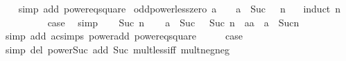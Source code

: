 \begin{isabellebody}
%
\isadelimproof
\ \ %
\endisadelimproof
%
\isatagproof
{}\isamarkupfalse%
\ {\isacharparenleft}{\kern0pt}simp\ add{\isacharcolon}{\kern0pt}\ power{}{\isacharunderscore}{\kern0pt}eq{\isacharunderscore}{\kern0pt}square{\isacharparenright}{\kern0pt}%
\endisatagproof
{\isafoldproof}%
%
\isadelimproof
\isanewline
%
\endisadelimproof
\isanewline
{}\isamarkupfalse%
\ odd{\isacharunderscore}{\kern0pt}power{\isacharunderscore}{\kern0pt}less{\isacharunderscore}{\kern0pt}zero{\isacharcolon}{\kern0pt}\ {\isachardoublequoteopen}a\ {\isacharless}{\kern0pt}\ {}\ {\isasymLongrightarrow}\ a\ {\isacharcircum}{\kern0pt}\ Suc\ {\isacharparenleft}{\kern0pt}{}\ {\isacharasterisk}{\kern0pt}\ n{\isacharparenright}{\kern0pt}\ {\isacharless}{\kern0pt}\ {}{\isachardoublequoteclose}\isanewline
%
\isadelimproof
%
\endisadelimproof
%
\isatagproof
{}\isamarkupfalse%
\ {\isacharparenleft}{\kern0pt}induct\ n{\isacharparenright}{\kern0pt}\isanewline
\ \ \isamarkupfalse%
\ {}\isanewline
\ \ \isamarkupfalse%
\ \isamarkupfalse%
\ {\isacharquery}{\kern0pt}case\ \isamarkupfalse%
\ simp\isanewline
{}\isamarkupfalse%
\isanewline
\ \ \isamarkupfalse%
\ {\isacharparenleft}{\kern0pt}Suc\ n{\isacharparenright}{\kern0pt}\isanewline
\ \ \isamarkupfalse%
\ {\isachardoublequoteopen}a\ {\isacharcircum}{\kern0pt}\ Suc\ {\isacharparenleft}{\kern0pt}{}\ {\isacharasterisk}{\kern0pt}\ Suc\ n{\isacharparenright}{\kern0pt}\ {\isacharequal}{\kern0pt}\ {\isacharparenleft}{\kern0pt}a{\isacharasterisk}{\kern0pt}a{\isacharparenright}{\kern0pt}\ {\isacharasterisk}{\kern0pt}\ a\ {\isacharcircum}{\kern0pt}\ Suc{\isacharparenleft}{\kern0pt}{}{\isacharasterisk}{\kern0pt}n{\isacharparenright}{\kern0pt}{\isachardoublequoteclose}\isanewline
\ \ \ \ \isamarkupfalse%
\ {\isacharparenleft}{\kern0pt}simp\ add{\isacharcolon}{\kern0pt}\ ac{\isacharunderscore}{\kern0pt}simps\ power{\isacharunderscore}{\kern0pt}add\ power{}{\isacharunderscore}{\kern0pt}eq{\isacharunderscore}{\kern0pt}square{\isacharparenright}{\kern0pt}\isanewline
\ \ \isamarkupfalse%
\ \isamarkupfalse%
\ {\isacharquery}{\kern0pt}case\isanewline
\ \ \ \ \isamarkupfalse%
\ {\isacharparenleft}{\kern0pt}simp\ del{\isacharcolon}{\kern0pt}\ power{\isacharunderscore}{\kern0pt}Suc\ add{\isacharcolon}{\kern0pt}\ Suc\ mult{\isacharunderscore}{\kern0pt}less{\isacharunderscore}{\kern0pt}{}{\isacharunderscore}{\kern0pt}iff\ mult{\isacharunderscore}{\kern0pt}neg{\isacharunderscore}{\kern0pt}neg{\isacharparenright}{\kern0pt}\isanewline

\end{isabellebody}

